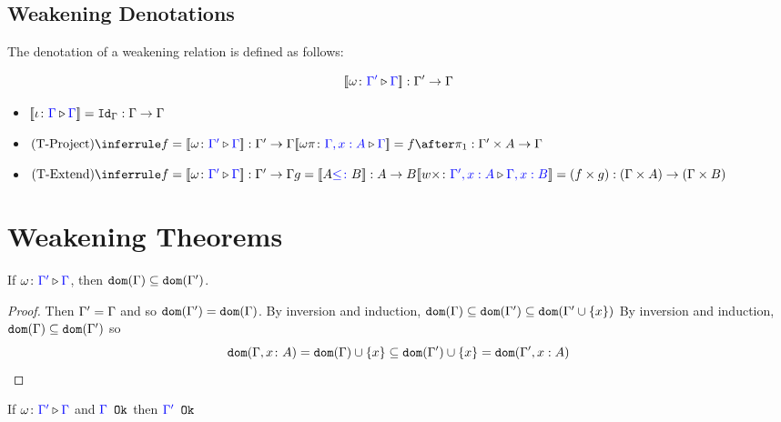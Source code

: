 \documentclass{report}
\begin{document}
\subsection{Weakening Denotations}
The denotation of a weakening relation is defined as follows:

\begin{equation}
    {\bf [\![}\omega \colon {\color{blue}\Gamma'} \triangleright {\color {blue} \Gamma}{\bf ]\!]}: \Gamma' \rightarrow \Gamma
\end{equation}

\begin{itemize}
    \item ${\bf [\![}\iota \colon {\color{blue}\Gamma} \triangleright {\color {blue} \Gamma}{\bf ]\!]} = \texttt{Id}_{\Gamma}: \Gamma \rightarrow \Gamma$
    
    \item $\ntreeruleI{\tproject}{f = \deno{\wrel{\w}{\G'}{\G}}: \G' \rightarrow \G}{\deno{\wrel{\w \pi}{\G, x: A}{\G}} = f\after \p: \G'\times A \rightarrow \G}$
    
    \item $\ntreeruleII{\textend}{f = \deno{\wrel{\w}{\G'}{\G}}: \G' \rightarrow \G }{ g = \deno{A \subtype B}: A \rightarrow B}{\deno{\wrel{w \x}{\G', x: A}{\G, x: B}} = (f\times g): (\G\times A)\rightarrow(\G\times B)}$
\end{itemize}

\section{Weakening Theorems}

\begin{lemma}
    If $\omega \colon {\color{blue}\Gamma'} \triangleright {\color {blue} \Gamma}$, then $\texttt{dom}(\Gamma)\subseteq \texttt{dom}(\Gamma')$.
\end{lemma}



\begin{framed}
    \begin{proof}
        \case{\tid}
        Then $\Gamma' = \Gamma$ and so $\texttt{dom}(\Gamma') = \texttt{dom}(\Gamma)$.
        \case{\tproject}
        By inversion and induction, $\texttt{dom}(\Gamma)\subseteq\texttt{dom}(\Gamma')\subseteq\texttt{dom}(\Gamma'\cup\left\{x\right\})$
        \case{\textend}
        By inversion and induction, $\texttt{dom}(\Gamma)\subseteq\texttt{dom}(\Gamma')$ so 
        $$\texttt{dom}(\Gamma, x\colon A) = \texttt{dom}(\Gamma)\cup\left\{x\right\} \subseteq\texttt{dom}(\Gamma')\cup\left\{x\right\} = \texttt{dom}(\Gamma',x:A)$$
    \end{proof}
\end{framed}


\begin{theorem}[Ok Preservation]\label{WeakeningPropertyOne}
    If $\omega \colon {\color{blue}\Gamma'} \triangleright {\color {blue} \Gamma}$ and ${\color{blue} \Gamma} \texttt{ Ok}$ then ${\color{blue} \Gamma'} \texttt{ Ok}$  
\end{theorem}
\end{document}
